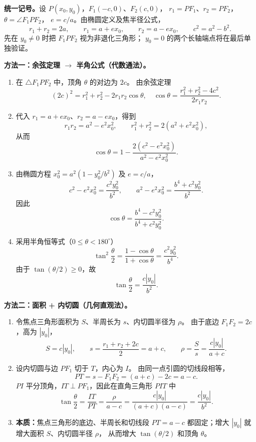 \begin{proofbox}
\textbf{统一记号。}设 $P(x_0,y_0)$，$F_1(-c,0)$、$F_2(c,0)$，
$r_1=PF_1$、$r_2=PF_2$，$\theta=\angle F_1PF_2$，
$e=c/a$。由椭圆定义及焦半径公式，
\[
 r_1+r_2=2a,\qquad r_1=a+ex_0,\qquad r_2=a-ex_0,
 \qquad c^2=a^2-b^2.
\]
先在 $y_0\ne0$ 时把 $F_1PF_2$ 视为非退化三角形；
$y_0=0$ 的两个长轴端点将在最后单独验证。

\medskip
\textbf{方法一：余弦定理 $\boldsymbol{\to}$ 半角公式（代数通法）。}
\begin{enumerate}
  \item 在 $\triangle F_1PF_2$ 中，顶角 $\theta$ 的对边为 $2c$。
  由余弦定理
  \[
  (2c)^2=r_1^2+r_2^2-2r_1r_2\cos\theta,
  \quad
  \cos\theta=\frac{r_1^2+r_2^2-4c^2}{2r_1r_2}.
  \]

  \item 代入 $r_1=a+ex_0$、$r_2=a-ex_0$，得到
  \[
  r_1r_2=a^2-e^2x_0^2,\qquad
  r_1^2+r_2^2=2(a^2+e^2x_0^2),
  \]
  从而
  \[
  \cos\theta
  =1-\frac{2(c^2-e^2x_0^2)}{a^2-e^2x_0^2}.
  \]

  \item 由椭圆方程 $x_0^2=a^2(1-y_0^2/b^2)$ 及 $e=c/a$，
  \[
  c^2-e^2x_0^2=\frac{c^2y_0^2}{b^2},\qquad
  a^2-e^2x_0^2=\frac{b^4+c^2y_0^2}{b^2}.
  \]
  因此
  \[
  \boxed{\cos\theta=\frac{b^4-c^2y_0^2}{b^4+c^2y_0^2}}.
  \]

  \item 采用半角恒等式（$0\leq\theta<180^\circ$）
  \[
  \tan^2\frac\theta2=\frac{1-\cos\theta}{1+\cos\theta}
  =\frac{c^2y_0^2}{b^4}.
  \]
  由于 $\tan(\theta/2)\geq0$，故
  \[
  \boxed{\tan\frac\theta2=\frac{c|y_0|}{b^2}}.
  \]
\end{enumerate}

\medskip
\textbf{方法二：面积 + 内切圆（几何直观法）。}
\begin{enumerate}
  \item 令焦点三角形面积为 $S$、半周长为 $s$、内切圆半径为 $\rho$。
  由于底边 $F_1F_2=2c$，高为 $|y_0|$，
  \[
   S=c|y_0|,\qquad
   s=\frac{r_1+r_2+2c}{2}=a+c,\qquad
   \rho=\frac S s=\frac{c|y_0|}{a+c}.
  \]

  \item 设内切圆与边 $PF_1$ 切于 $T$，内心为 $I$。
  由同一点引圆的切线段相等，
  \[
  PT=s-F_1F_2=(a+c)-2c=a-c.
  \]
  $PI$ 平分顶角，$IT\perp PF_1$，因此在直角三角形 $PIT$ 中
  \[
  \tan\frac\theta2=\frac{IT}{PT}
  =\frac{\rho}{a-c}
  =\frac{c|y_0|}{(a+c)(a-c)}
  =\boxed{\frac{c|y_0|}{b^2}}.
  \]
  \item \textbf{本质：}焦点三角形的底边、半周长和切线段 $PT=a-c$
  都固定；增大 $|y_0|$ 就增大面积 $S$、内切圆半径 $\rho$，
  从而增大 $\tan(\theta/2)$ 和顶角 $\theta$。
\end{enumerate}


\end{proofbox}
